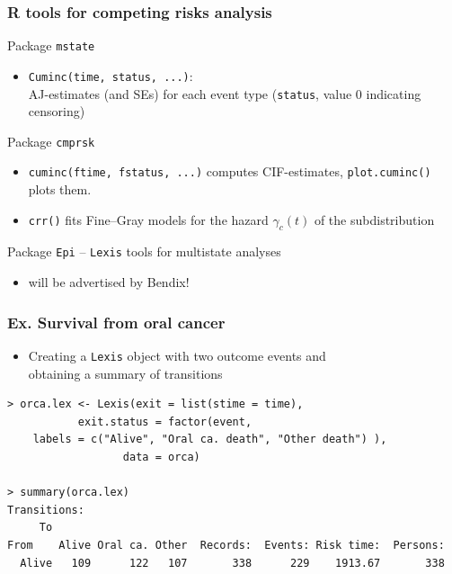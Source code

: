 \documentclass[handout,12pt,dvipsnames,t]{beamer}
\begin{document}
\begin{frame}[fragile]

\frametitle{R tools for competing risks analysis}

Package \texttt{mstate}
\begin{itemize}
\item \texttt{Cuminc(time, status, ...)}:  \\
 AJ-estimates (and SEs) for each event type 
  (\texttt{status}, value 0 indicating censoring)
\end{itemize}
Package \texttt{cmprsk}
\begin{itemize}
\item \texttt{cuminc(ftime, fstatus, ...)} 
  computes CIF-estimates,  %
   \texttt{plot.cuminc()} plots them. 
  \medskip
\item \texttt{crr()}
 fits Fine--Gray models for 
the hazard $\gamma_c(t)$ of the subdistribution
\end{itemize}   
Package \texttt{Epi} -- \texttt{Lexis} tools for multistate analyses
\begin{itemize}
\item  will be advertised by Bendix!
\end{itemize}

\end{frame}

\begin{frame}[fragile]
\frametitle{Ex. Survival from oral cancer}

\begin{itemize}
\item
Creating a {\tt Lexis} object with two outcome events and \\ 
obtaining a summary of transitions
\end{itemize}
\small
\begin{verbatim}
> orca.lex <- Lexis(exit = list(stime = time), 
           exit.status = factor(event, 
    labels = c("Alive", "Oral ca. death", "Other death") ),
                  data = orca)

> summary(orca.lex)  
Transitions:
     To
From    Alive Oral ca. Other  Records:  Events: Risk time:  Persons:
  Alive   109      122   107       338      229    1913.67       338
\end{verbatim}
\normalsize

\end{frame}
\end{document}
